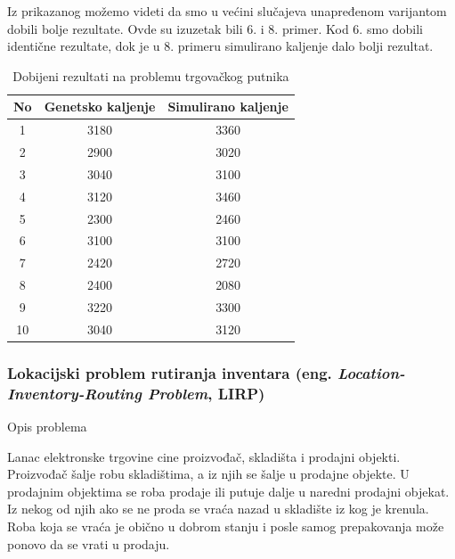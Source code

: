 \documentclass[a4paper]{article}
\begin{document}
Iz prikazanog možemo videti da smo u većini slučajeva unapređenom varijantom dobili bolje rezultate. Ovde su izuzetak bili 6. i 8. primer. Kod 6. smo dobili identične rezultate, dok je u 8. primeru simulirano kaljenje dalo bolji rezultat.

\newpage
\begin{table}[ht]
\begin{center}
\begin{tabular}{|c|c|c|} \hline
     No & Genetsko kaljenje & Simulirano kaljenje  \\ \hline
     1 &  3180 & 3360 \\ \hline
     2 &  2900 & 3020 \\ \hline
     3 &  3040 & 3100 \\ \hline
     4 &  3120 & 3460 \\ \hline
     5 &  2300 & 2460 \\ \hline
     6 &  3100 & 3100 \\ \hline
     7 &  2420 & 2720 \\ \hline
     8 &  2400 & 2080 \\ \hline
     9 &  3220 & 3300 \\ \hline
     10 & 3040 & 3120 \\ \hline
\end{tabular}
\end{center}
\label{tabela:1}
\caption{Dobijeni rezultati na problemu trgovačkog putnika}
\end{table}

\subsubsection{Lokacijski problem rutiranja inventara (eng. \textit{Location-Inventory-Routing Problem}, LIRP) \cite{gannealingaplication}}

\large{Opis problema}  \normalsize

Lanac elektronske trgovine cine proizvođač, skladišta i prodajni objekti. Proizvođač šalje robu skladištima, a iz njih se šalje u prodajne objekte. U prodajnim objektima se roba prodaje ili putuje dalje u naredni prodajni objekat. Iz nekog od njih ako se ne proda se vraća nazad u skladište iz kog je krenula. Roba koja se vraća je obično u dobrom stanju i posle samog prepakovanja može ponovo da se vrati u prodaju. 
\end{document}
